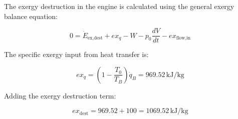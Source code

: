 The exergy destruction in the engine is calculated using the general exergy balance equation:  

\[
0 = \dot{E}_{\text{ex,dest}} + ex_q - W - p_0 \frac{dV}{dt} - ex_{\text{flow,in}}
\]

The specific exergy input from heat transfer is:  

\[
ex_q = \left( 1 - \frac{T_0}{T_B} \right) \dot{q}_B = 969.52 \, \text{kJ/kg}
\]

Adding the exergy destruction term:  

\[
ex_{\text{dest}} = 969.52 + 100 = 1069.52 \, \text{kJ/kg}
\]